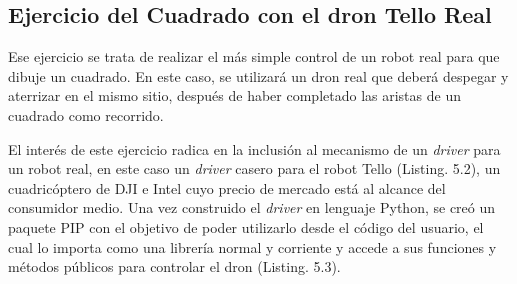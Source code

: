 \subsection{Ejercicio del Cuadrado con el dron Tello Real}

Ese ejercicio se trata de realizar el más simple control de un robot real para que dibuje un cuadrado. En este caso, se utilizará un dron real que deberá despegar y aterrizar en el mismo sitio, después de haber completado las aristas de un cuadrado como recorrido.

El interés de este ejercicio radica en la inclusión al mecanismo de un \textit{driver} para un robot real, en este caso un \textit{driver} casero para el robot Tello (Listing. 5.2), un cuadricóptero de DJI e Intel cuyo precio de mercado está al alcance del consumidor medio. Una vez construido el \textit{driver} en lenguaje Python, se creó un paquete PIP con el objetivo de poder utilizarlo desde el código del usuario, el cual lo importa como una librería normal y corriente y accede a sus funciones y métodos públicos para controlar el dron (Listing. 5.3). 


